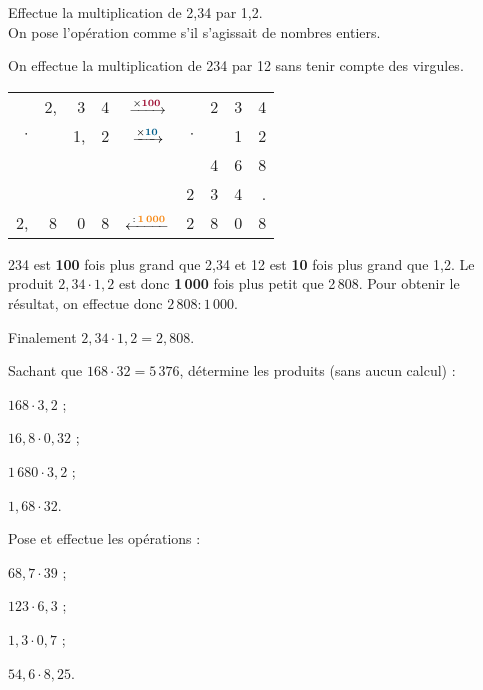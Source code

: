 \begin{methode*1}

\begin{exemple*1}

Effectue la multiplication de 2,34 par 1,2.\\[1em]

On pose l'opération comme s'il s'agissait de nombres entiers. 

On effectue la multiplication de 234 par 12 sans tenir compte des virgules.

\begin{minipage}{.6\linewidth}
\begin{tabular}{rrrrcrrrr}
& 2, & 3 & 4 & $\xrightarrow{\times \text{\textcolor{B1}{\textbf{100}}}}$ & & 2 & 3 & 4 \\
$\cdot$ & & 1, & 2 & $\xrightarrow{\times \text{\textcolor{A1}{\textbf{10}}}}$ & $\cdot$ & & 1 & 2 \\ \cline{1-4} \cline{6-9}
& & & & & & 4 & 6 & 8 \\
& & & & & 2 & 3 & 4 & . \\ \cline{1-4} \cline{6-9}
2, & 8 & 0 & 8 & $\xleftarrow{\,:\,\text{\textcolor{J1}{\textbf{1\,000}}}}$ & 2 & 8 & 0 & 8 \\
\end{tabular}
\end{minipage}\hfill%
%
\begin{minipage}{.37\linewidth}
234 est \textcolor{B1}{\textbf{100}} fois plus grand que 2,34 et 12 est \textcolor{A1}{\textbf{10}} fois plus grand que 1,2. Le produit $2,34 \cdot 1,2$ est donc \textcolor{J1}{\textbf{1\,000}} fois plus petit que 2\,808. Pour obtenir le résultat, on effectue donc $2\,808 : 1\,000$.\\[0.75em]
\end{minipage}
Finalement $2,34 \cdot 1,2 = 2,808$.
\end{exemple*1}

\exercice
Sachant que $168 \cdot 32 = 5\,376$, détermine les produits (sans aucun calcul) :
\begin{colenumerate}{4}
 \item $168 \cdot 3,2$ ;
 \item $16,8 \cdot 0,32$ ;
 \item $1\,680 \cdot 3,2$ ;
 \item $1,68 \cdot 32$.
\end{colenumerate}

\exercice

Pose et effectue les opérations :
\begin{colenumerate}{4}
 \item $68,7 \cdot 39$ ;
 \item $123 \cdot 6,3$ ;
 \item $1,3 \cdot 0,7$ ;
 \item $54,6 \cdot 8,25$.
\end{colenumerate}

\end{methode*1}

